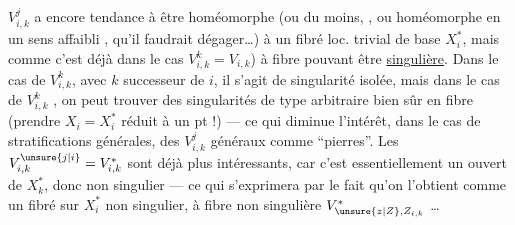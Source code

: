 $V_{i,k}^j$ a encore tendance à être  homéomorphe (ou du moins, , ou homéomorphe en un sens affaibli , qu'il faudrait dégager\ldots) à un fibré loc. trivial de base $X_i^*$, mais comme c'est déjà dans le cas $V_{i,k}^k=V_{i,k}$) à fibre pouvant être \uline{singulière}. Dans le cas de $V_{i,k}^k$,
avec $k$ successeur de $i$, il s'agit de singularité isolée, mais dans le cas de $V_{i,k}^k$ , on peut trouver des singularités de type arbitraire bien sûr en fibre (prendre $X_i=X_i^*$ réduit à un pt !) — ce qui diminue l'intérêt, dans le cas de stratifications  générales, des $V_{i,k}^j$ généraux comme ``pierres''. Les $V_{i,k}^{\unsure{j|i}}=V_{i,k}^*$ sont déjà plus intéressants, car  c'est essentiellement un  ouvert de $X_k^*$, donc non singulier — ce qui s'exprimera par le fait qu'on l'obtient comme un fibré sur $X_i^*$ non singulier, à fibre non singulière $V_{\unsure{z|Z},Z_{i,k}}^*$ \ldots

